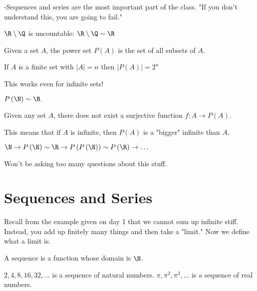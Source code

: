 
-Sequences and series are the most important part of the class. "If you don't understand this, you are going to fail."

\begin{theorem}
	$\R \setminus \Q$ is uncountable: $\R \setminus \Q \sim \R$
\end{theorem}

\begin{definition}
	Given a set $A$, the power set $P\left( A \right) $ is the set of all subsets of $A$.
\end{definition}

\begin{theorem}
	If $A$ is a finite set with $\left|A\right| = n$ then $\left|P\left( A \right) \right| = 2^{n}$
\end{theorem}

This works even for infinite sets!

\begin{theorem}
	$P\left( \N \right) \sim \R$ 
\end{theorem}

\begin{theorem}
	Given any set $A$, there does not exist a surjective function $f: A \to P\left( A \right) $.
\end{theorem}

This means that if $A$ is infinite, then $P\left( A \right) $ is a "bigger" infinite than $A$.

\begin{eg}
	$\N \to P\left( \N \right) \sim \R \to P\left( P\left( \N \right)  \right) \sim P\left( \R \right) \to \ldots  $
\end{eg}

Won't be asking too many questions about this stuff.

\section{Sequences and Series}

Recall from the example given on day 1 that we cannot sum up infinite stiff. Instead, you add up finitely many things and then take a "limit." Now we define what a limit is.

\begin{definition}
	A sequence is a function whose domain is $\N$.
\end{definition}

\begin{eg}
	$2, 4, 8, 16, 32, \ldots$ is a sequence of natural numbers. $\pi, \pi^{2}, \pi^{3}, \ldots$ is a sequence of real numbers.
\end{eg}

